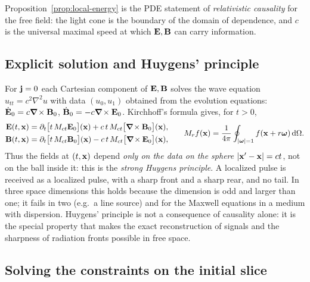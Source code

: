 Proposition~\ref{prop:local-energy} is the PDE statement of
\emph{relativistic causality} for the free field: the light cone is the
boundary of the domain of dependence, and $c$ is the universal maximal speed
at which $\mathbf{E},\mathbf{B}$ can carry information.

\subsection{Explicit solution and Huygens' principle}

For $\mathbf{j}=0$ each Cartesian component of $\mathbf{E},\mathbf{B}$ solves the wave
equation $u_{tt}=c^2\nabla^2u$ with data $(u_0,u_1)$ obtained from
the evolution equations: $\dot{\mathbf{E}}_0=c\boldsymbol{\nabla}\!\times\mathbf{B}_0$, $\dot{\mathbf{B}}_0=-c\boldsymbol{\nabla}\!\times\mathbf{E}_0$.
Kirchhoff's formula gives, for $t>0$,
\begin{equation}\label{eq:kirchhoff}
\begin{aligned}
\mathbf{E}(t,\mathbf{x})&=\partial_t\big[t\,M_{ct}\mathbf{E}_0\big](\mathbf{x})+c\,t\,M_{ct}\big[\boldsymbol{\nabla}\!\times\mathbf{B}_0\big](\mathbf{x}),\\
\mathbf{B}(t,\mathbf{x})&=\partial_t\big[t\,M_{ct}\mathbf{B}_0\big](\mathbf{x})-c\,t\,M_{ct}\big[\boldsymbol{\nabla}\!\times\mathbf{E}_0\big](\mathbf{x}),
\end{aligned}
\qquad
M_rf(\mathbf{x})=\frac1{4\pi}\oint_{|\boldsymbol\omega|=1}f(\mathbf{x}+r\boldsymbol\omega)\,\mathrm{d}\Omega .
\end{equation}
Thus the fields at $(t,\mathbf{x})$ depend \emph{only on the data on the sphere
$|\mathbf{x}'-\mathbf{x}|=ct$}, not on the ball inside it: this is the \emph{strong
Huygens principle}.  A localized pulse is received as a localized pulse,
with a sharp front and a sharp rear, and no tail.  In three space
dimensions this holds because the dimension is odd and larger than one;
it fails in two (e.g.\ a line source) and for the Maxwell
equations in a medium with dispersion.  Huygens' principle is not a
consequence of causality alone: it is the special property that makes
the exact reconstruction of signals and the sharpness of radiation
fronts possible in free space.

\subsection{Solving the constraints on the initial slice}

